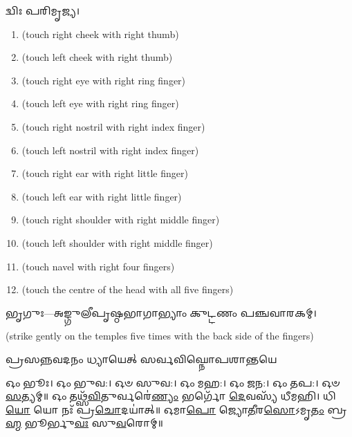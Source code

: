 𑌦𑍍𑌵𑌿𑌃 𑌪𑌰𑌿𑌮𑍃𑌜𑍍𑌯।


\begin{enumerate}
    \item {} {\scriptsize (touch right cheek with right thumb)}
    \item {} {\scriptsize (touch left cheek with right thumb)}
    \item {} {\scriptsize (touch right eye with right ring finger)}
    \item {} {\scriptsize (touch left eye with right ring finger)}
    \item {} {\scriptsize (touch right nostril with right index finger)}
    \item {} {\scriptsize (touch left nostril with right index finger)}
    \item {} {\scriptsize (touch right ear with right little finger)}
    \item {} {\scriptsize (touch left ear with right little finger)}
    \item {} {\scriptsize (touch right shoulder with right middle finger)}
    \item {} {\scriptsize (touch left shoulder with right middle finger)}
    \item {} {\scriptsize (touch navel with right four fingers)}
    \item {} {\scriptsize (touch the centre of the head with all five fingers)}
\end{enumerate}



𑌭𑍃𑌗𑍁𑌃—𑌅𑌙𑍍𑌗𑍁𑌲𑍀𑌪𑍃𑌷𑍍𑌠𑌭𑌾𑌗𑌾𑌭𑍍𑌯𑌾𑌂 𑌕𑍁𑌟𑍍𑌟𑌣𑌂 𑌪𑌞𑍍𑌚𑌵𑌾𑌰𑌕𑌮𑍍।

{\scriptsize (strike gently on the temples five times with the back side of the fingers)}

{𑌪𑍍𑌰𑌸𑌨𑍍𑌨𑌵𑌦𑌨𑌂 𑌧𑍍𑌯𑌾𑌯𑍇𑌤𑍍 𑌸𑌰𑍍𑌵𑌵𑌿𑌘𑍍𑌨𑍋𑌪𑌶𑌾𑌨𑍍𑌤𑌯𑍇}


𑌓𑌂 𑌭𑍂𑌃। 𑌓𑌂 𑌭𑍁𑌵:। 𑌓𑍞 𑌸𑍁𑌵:। 𑌓𑌂 𑌮𑌹:। 𑌓𑌂 𑌜𑌨:। 𑌓𑌂 𑌤𑌪:। 𑌓𑍞 \ul{𑌸}\-𑌤𑍍𑌯𑌮𑍍॥
𑌓𑌂 𑌤𑌥𑍍𑌸᳴\-\ul{𑌵𑌿}\-𑌤𑍁𑌰𑍍𑌵𑌰𑍇॑\-\ul{𑌣𑍍𑌯𑌂} 𑌭𑌰𑍍𑌗𑍋᳴ \ul{𑌦𑍇}\-𑌵𑌸𑍍𑌯᳴ 𑌧𑍀𑌮𑌹𑌿। 𑌧𑌿\-\ul{𑌯𑍋} 𑌯𑍋 𑌨𑌃᳴ 𑌪𑍍𑌰\-\ul{𑌚𑍋}\-𑌦𑌯𑌾॑𑌤𑍍॥
𑌓𑌮𑌾\-\ul{𑌪𑍋} 𑌜𑍍𑌯𑍋\-\ul{𑌤𑍀}\-𑌰\-\ul{𑌸𑍋}\-𑌽𑌮𑍃\-\ul{𑌤𑌂} 𑌬𑍍𑌰\-\ul{𑌹𑍍𑌮} 𑌭𑍂𑌰𑍍𑌭𑍁\-\ul{𑌵𑌃} 𑌸𑍁\-\ul{𑌵}\-𑌰𑍋𑌮𑍍॥

